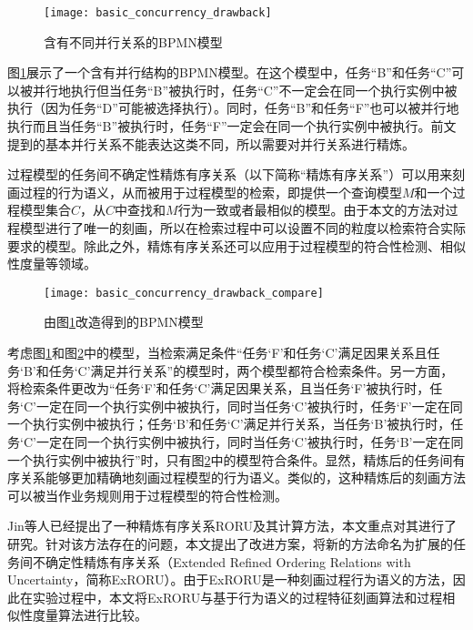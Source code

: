 \begin{figure}[htbp]
  \centering
  \texttt{[image: basic\_concurrency\_drawback]}
  \caption{含有不同并行关系的BPMN模型\label{fig:basic_concurrency_drawback}}
\end{figure}

\begin{example}\label{ex:basic_concurrency_drawback}
图\ref{fig:basic_concurrency_drawback}展示了一个含有并行结构的BPMN模型。在这个模型中，任务“B”和任务“C”可以被并行地执行但当任务“B”被执行时，任务“C”不一定会在同一个执行实例中被执行（因为任务“D”可能被选择执行）。同时，任务“B”和任务“F”也可以被并行地执行而且当任务“B”被执行时，任务“F”一定会在同一个执行实例中被执行。前文提到的基本并行关系不能表达这类不同，所以需要对并行关系进行精炼。
\end{example}

过程模型的任务间不确定性精炼有序关系（以下简称“精炼有序关系”）可以用来刻画过程的行为语义，从而被用于过程模型的检索，即提供一个查询模型$M$和一个过程模型集合$C$，从$C$中查找和$M$行为一致或者最相似的模型。由于本文的方法对过程模型进行了唯一的刻画，所以在检索过程中可以设置不同的粒度以检索符合实际要求的模型。除此之外，精炼有序关系还可以应用于过程模型的符合性检测、相似性度量等领域。

\begin{figure}[htbp]
  \centering
  \texttt{[image: basic\_concurrency\_drawback\_compare]}
  \caption{由图\ref{fig:basic_concurrency_drawback}改造得到的BPMN模型\label{fig:basic_concurrency_drawback_compare}}
\end{figure}

\begin{example}\label{ex:basic_concurrency_drawback_compare}
考虑图\ref{fig:basic_concurrency_drawback}和图\ref{fig:basic_concurrency_drawback_compare}中的模型，当检索满足条件“任务`F'和任务`C'满足因果关系且任务`B'和任务`C'满足并行关系”的模型时，两个模型都符合检索条件。另一方面，将检索条件更改为“任务`F'和任务`C'满足因果关系，且当任务`F'被执行时，任务`C'一定在同一个执行实例中被执行，同时当任务`C'被执行时，任务`F'一定在同一个执行实例中被执行；任务`B'和任务`C'满足并行关系，当任务`B'被执行时，任务`C'一定在同一个执行实例中被执行，同时当任务`C'被执行时，任务`B'一定在同一个执行实例中被执行”时，只有图\ref{fig:basic_concurrency_drawback_compare}中的模型符合条件。显然，精炼后的任务间有序关系能够更加精确地刻画过程模型的行为语义。类似的，这种精炼后的刻画方法可以被当作业务规则用于过程模型的符合性检测。
\end{example}

Jin等人已经提出了一种精炼有序关系RORU及其计算方法\cite{jin2014computing}，本文重点对其进行了研究。针对该方法存在的问题，本文提出了改进方案，将新的方法命名为扩展的任务间不确定性精炼有序关系（Extended Refined Ordering Relations with Uncertainty，简称ExRORU）。由于ExRORU是一种刻画过程行为语义的方法，因此在实验过程中，本文将ExRORU与基于行为语义的过程特征刻画算法和过程相似性度量算法进行比较。


